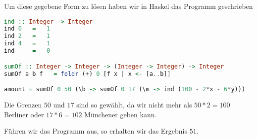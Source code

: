 \documentclass[11pt,a4paper,ngerman]{article}
\begin{document}
Um diese gegebene Form zu lösen haben wir in Haskel das Programm geschrieben

\begin{lstlisting}[language=Haskell]
ind :: Integer -> Integer
ind 0   =   1
ind 2   =   1
ind 4   =   1
ind _   =   0

sumOf :: Integer -> Integer -> (Integer -> Integer) -> Integer
sumOf a b f   = foldr (+) 0 [f x | x <- [a..b]]

amount = sumOf 0 50 (\b -> sumOf 0 17 (\m -> ind (100 - 2*x - 6*y)))
\end{lstlisting}

Die Grenzen $50$ und $17$ sind so gewählt, da wir nicht mehr als $50*2 = 100$ Berliner oder
$17*6 = 102$ Münchener geben kann.

Führen wir das Programm aus, so erhalten wir das Ergebnis $51$.

\label{LastPage}
\end{document}
